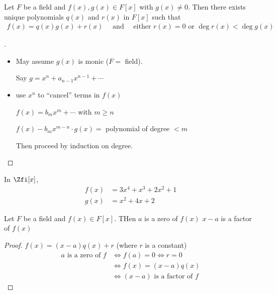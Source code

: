 \documentclass[a4paper]{article}
\begin{document}
\begin{theorem}
  Let \( F \) be a field and \( f(x), g(x)\in F[x] \) with \( g(x)\neq 0 \). Then there exists unique polynomials \( q(x) \) and \( r(x) \) in \( F[x] \) such that
  \begin{align*}
    f(x) = q(x)g(x) + r(x) \quad \text{ and } \quad \text{either } r(x) = 0 \text{ or } \deg r(x) < \deg g(x)
  \end{align*}
\end{theorem}

\begin{proof}[]\
  \begin{itemize}
    \item May assume \( g(x) \) is monic (\( F = \) field).

    Say \( g=x^n + a_{n-1}x^{n-1}+\cdots\)
    \item use \( x^n \) to ``cancel'' terms in \( f(x) \)

    \( f(x) = b_mx^m+ \cdots \) with \( m\geq n \)

    \( f(x) - b_mx^{m-n}\cdot g(x) =  \) polynomial of degree \( < m \)

    Then proceed by induction on degree.
  \end{itemize}
\end{proof}

\begin{example} In \( \Zfi[x] \),
\begin{align*}
  f(x) &= 3x^4 + x^3 + 2x^2 + 1 \\
  g(x) &= x^2 + 4x + 2
\end{align*}
\end{example}

\begin{corollary}
  Let \( F \) be a field and \( f(x) \in F[x] \). THen \( a \) is a zero of \( f(x) \) \iff \( x-a \) is a factor of \( f(x) \)
\end{corollary}

\begin{proof}
  \( f(x) = (x-a)q(x) + r \) (where \( r \) is a constant)
\begin{align*}
 a \text{ is a zero of } f  &\iff  f(a) = 0 \iff r=0 \\
  &\iff  f(x) = (x-a)q(x) \\
  &\iff  (x-a) \text{ is a factor of } f
\end{align*}
\end{proof}
\end{document}

